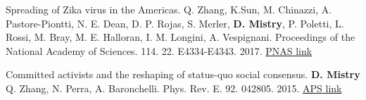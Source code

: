 \begin{cventries}
  \cvpublicationentry
    {Spreading of Zika virus in the Americas.} %
    {Q. Zhang, K.Sun, M. Chinazzi, A. Pastore-Piontti, N. E. Dean, D. P. Rojas, S. Merler, \textbf{D. Mistry}, P. Poletti, L. Rossi, M. Bray, M. E. Halloran, I. M. Longini, A. Vespignani.} %
    {Proceedings of the National Academy of Sciences.} %
    { 114.} %
    { 22.} %
    { E4334-E4343.} %
    { 2017.} %
    {} %
    {\href{https:/doi.org/10.1073/1620161114}{PNAS link}} %

  \cvpublicationentry
    {Committed activists and the reshaping of status-quo social consensus.} %
    {\textbf{D. Mistry} Q. Zhang, N. Perra, A. Baronchelli.} %
    {Phys. Rev. E.} %
    { 92.} %
    { } %
    {042805. } %
    { 2015.} %
    {} %
    {\href{https:/doi.org/10.1103/PhysRevE.92.042805}{APS link}} %
\end{cventries}